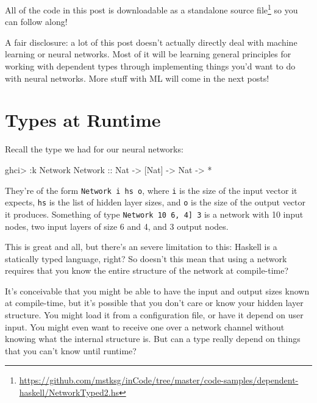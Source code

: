 \documentclass[]{article}
\newenvironment{Shaded}{}{}
\newcommand{\DataTypeTok}[1]{\textcolor[rgb]{0.56,0.13,0.00}{#1}}
\newcommand{\NormalTok}[1]{#1}
\newcommand{\OperatorTok}[1]{\textcolor[rgb]{0.40,0.40,0.40}{#1}}
\newcommand{\OtherTok}[1]{\textcolor[rgb]{0.00,0.44,0.13}{#1}}
\renewcommand{\href}[2]{#2\footnote{\url{#1}}}
\begin{document}
All of the code in this post is
\href{https://github.com/mstksg/inCode/tree/master/code-samples/dependent-haskell/NetworkTyped2.hs}{downloadable
as a standalone source file} so you can follow along!

A fair disclosure: a lot of this post doesn't actually directly deal with
machine learning or neural networks. Most of it will be learning general
principles for working with dependent types through implementing things you'd
want to do with neural networks. More stuff with ML will come in the next posts!

\section{Types at Runtime}\label{types-at-runtime}

Recall the type we had for our neural networks:

\begin{Shaded}
\begin{Highlighting}[]
\NormalTok{ghci}\OperatorTok{\textgreater{}} \OperatorTok{:}\NormalTok{k }\DataTypeTok{Network}
\DataTypeTok{Network}\OtherTok{ ::} \DataTypeTok{Nat} \OtherTok{{-}\textgreater{}}\NormalTok{ [}\DataTypeTok{Nat}\NormalTok{] }\OtherTok{{-}\textgreater{}} \DataTypeTok{Nat} \OtherTok{{-}\textgreater{}} \OperatorTok{*}
\end{Highlighting}
\end{Shaded}

They're of the form \texttt{Network\ i\ hs\ o}, where \texttt{i} is the size of
the input vector it expects, \texttt{hs} is the list of hidden layer sizes, and
\texttt{o} is the size of the output vector it produces. Something of type
\texttt{Network\ 10\ \textquotesingle{}{[}6,\ 4{]}\ 3} is a network with 10
input nodes, two input layers of size 6 and 4, and 3 output nodes.

This is great and all, but there's an severe limitation to this: Haskell is a
statically typed language, right? So doesn't this mean that using a network
requires that you know the entire structure of the network at compile-time?

It's conceivable that you might be able to have the input and output sizes known
at compile-time, but it's possible that you don't care or know your hidden layer
structure. You might load it from a configuration file, or have it depend on
user input. You might even want to receive one over a network channel without
knowing what the internal structure is. But can a type really depend on things
that you can't know until runtime?
\end{document}
